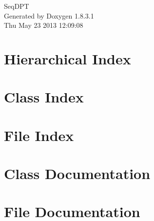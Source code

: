 \documentclass{book}
\begin{document}
\hypersetup{pageanchor=false,citecolor=blue}
\begin{titlepage}
\vspace*{7cm}
\begin{center}
{\Large Seq\-D\-P\-T }\\
\vspace*{1cm}
{\large Generated by Doxygen 1.8.3.1}\\
\vspace*{0.5cm}
{\small Thu May 23 2013 12:09:08}\\
\end{center}
\end{titlepage}
\clearemptydoublepage
{}
\tableofcontents
\clearemptydoublepage
{}
\hypersetup{pageanchor=true,citecolor=blue}
\chapter{Hierarchical Index}

\chapter{Class Index}

\chapter{File Index}

\chapter{Class Documentation}
















\chapter{File Documentation}



\printindex
\end{document}
